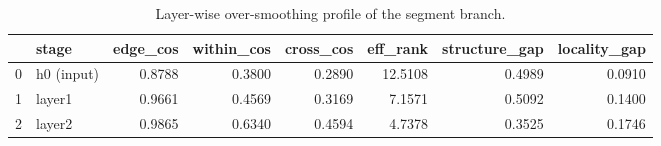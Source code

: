 \begin{table}[t]
\caption{Layer-wise over-smoothing profile of the segment branch.}
\label{tab:collapse}
\begin{tabular}{llrrrrrr}
\toprule
 & stage & edge\_cos & within\_cos & cross\_cos & eff\_rank & structure\_gap & locality\_gap \\
\midrule
0 & h0 (input) & 0.8788 & 0.3800 & 0.2890 & 12.5108 & 0.4989 & 0.0910 \\
1 & layer1 & 0.9661 & 0.4569 & 0.3169 & 7.1571 & 0.5092 & 0.1400 \\
2 & layer2 & 0.9865 & 0.6340 & 0.4594 & 4.7378 & 0.3525 & 0.1746 \\
\bottomrule
\end{tabular}
\end{table}
